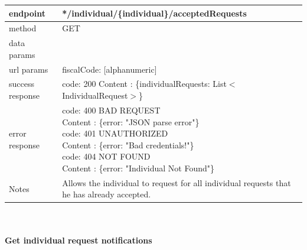\begin{legal}
\begin{legal}
\begin{itemize}
								\begin{tabularx}{\linewidth}{| l| l }
									\hline
									endpoint & */individual/\{individual\}/acceptedRequests \\
									\hline
									method & GET \\
									\hline
									data params & \\
									\hline
									url params &
									\parbox{0.7\textwidth}{
										\bigskip
										fiscalCode: [alphanumeric]
										\bigskip
									} \\
									\hline
									success response &
									\parbox{0.7\textwidth}{
										\bigskip
										code: 200\\
										Content : \{individualRequests: List$<$IndividualRequest$>$\}
										\bigskip
									} \\
									\hline
									error response &
									\parbox{0.7\textwidth}{
										\bigskip
										code: 400 BAD REQUEST \\
										Content : \{error: "JSON parse error"\}\\
										code: 401 UNAUTHORIZED \\
										Content : \{error: "Bad credentials!"\}\\
										code: 404 NOT FOUND \\
										Content : \{error: "Individual Not Found"\}
										\bigskip
									} \\
									\hline
									Notes & 
									\parbox{0.7\textwidth}{
										\bigskip Allows the individual to request for all individual requests that he has already accepted.
									\bigskip}  \\
									\hline
								\end{tabularx}\\\\
								
								\textbf{Get individual request notifications} \\
			

\end{itemize}
\end{legal}
\end{legal}
